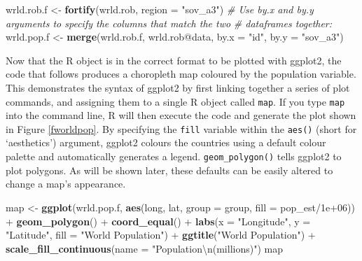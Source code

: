 \documentclass[]{article}
\newenvironment{Shaded}{}{}
\newcommand{\KeywordTok}[1]{\textcolor[rgb]{0.00,0.44,0.13}{\textbf{{#1}}}}
\newcommand{\DataTypeTok}[1]{\textcolor[rgb]{0.56,0.13,0.00}{{#1}}}
\newcommand{\FloatTok}[1]{\textcolor[rgb]{0.25,0.63,0.44}{{#1}}}
\newcommand{\CharTok}[1]{\textcolor[rgb]{0.25,0.44,0.63}{{#1}}}
\newcommand{\StringTok}[1]{\textcolor[rgb]{0.25,0.44,0.63}{{#1}}}
\newcommand{\CommentTok}[1]{\textcolor[rgb]{0.38,0.63,0.69}{\textit{{#1}}}}
\newcommand{\NormalTok}[1]{{#1}}
\begin{document}
\begin{Shaded}
\begin{Highlighting}[]
\NormalTok{wrld.rob.f <- }\KeywordTok{fortify}\NormalTok{(wrld.rob, }\DataTypeTok{region =} \StringTok{"sov_a3"}\NormalTok{)}
\CommentTok{# Use by.x and by.y arguments to specify the columns that match the two}
\CommentTok{# dataframes together:}
\NormalTok{wrld.pop.f <- }\KeywordTok{merge}\NormalTok{(wrld.rob.f, wrld.rob@data, }\DataTypeTok{by.x =} \StringTok{"id"}\NormalTok{, }\DataTypeTok{by.y =} \StringTok{"sov_a3"}\NormalTok{)}
\end{Highlighting}
\end{Shaded}

Now that the R object is in the correct format to be plotted with ggplot2, the code that follows
 produces a choropleth map coloured by the population variable. This
demonstrates the syntax of ggplot2 by first linking together a series
of plot commands, and assigning them to a single R object called
\texttt{map}. If you type \texttt{map} into the command line, R will
then execute the code and generate the plot shown in Figure \ref{fworldpop}. By specifying the
\texttt{fill} variable within the \texttt{aes()} (short for
`aesthetics') argument, ggplot2 colours the countries using a default
colour palette and automatically generates a legend.
\texttt{geom\_polygon()} tells ggplot2 to plot polygons. As will be
shown later, these defaults can be easily altered to change
a map's appearance.

\begin{Shaded}
\begin{Highlighting}[]
\NormalTok{map <-}\StringTok{ }\KeywordTok{ggplot}\NormalTok{(wrld.pop.f, }\KeywordTok{aes}\NormalTok{(long, lat, }\DataTypeTok{group =} \NormalTok{group, }\DataTypeTok{fill =} \NormalTok{pop_est/}\FloatTok{1e+06}\NormalTok{)) +}\StringTok{ }
\StringTok{    }\KeywordTok{geom_polygon}\NormalTok{() +}\StringTok{ }\KeywordTok{coord_equal}\NormalTok{() +}\StringTok{ }\KeywordTok{labs}\NormalTok{(}\DataTypeTok{x =} \StringTok{"Longitude"}\NormalTok{, }\DataTypeTok{y =} \StringTok{"Latitude"}\NormalTok{, }\DataTypeTok{fill =} \StringTok{"World Population"}\NormalTok{) +}\StringTok{ }
\StringTok{    }\KeywordTok{ggtitle}\NormalTok{(}\StringTok{"World Population"}\NormalTok{) +}\StringTok{ }\KeywordTok{scale_fill_continuous}\NormalTok{(}\DataTypeTok{name =} \StringTok{"Population}\CharTok{\textbackslash{}n}\StringTok{(millions)"}\NormalTok{)}
\NormalTok{map}
\end{Highlighting}
\end{Shaded}
\end{document}
